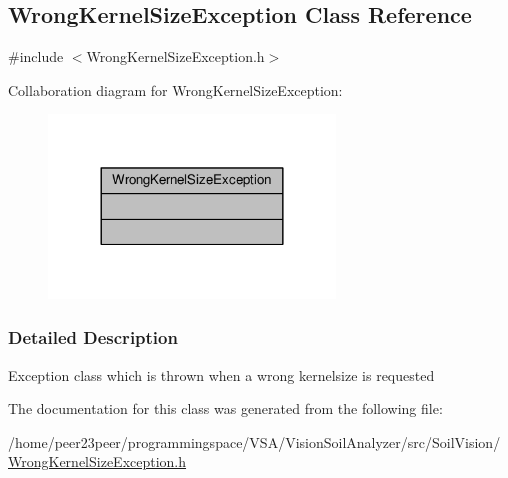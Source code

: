 \hypertarget{class_wrong_kernel_size_exception}{}\subsection{Wrong\+Kernel\+Size\+Exception Class Reference}
\label{class_wrong_kernel_size_exception}


{\ttfamily \#include $<$Wrong\+Kernel\+Size\+Exception.\+h$>$}



Collaboration diagram for Wrong\+Kernel\+Size\+Exception\+:
\nopagebreak
\begin{figure}[H]
\begin{center}
\leavevmode
\includegraphics[width=216pt]{class_wrong_kernel_size_exception__coll__graph}
\end{center}
\end{figure}


\subsubsection{Detailed Description}
Exception class which is thrown when a wrong kernelsize is requested 

The documentation for this class was generated from the following file\+:\begin{DoxyCompactItemize}
\item 
/home/peer23peer/programmingspace/\+V\+S\+A/\+Vision\+Soil\+Analyzer/src/\+Soil\+Vision/\hyperlink{_wrong_kernel_size_exception_8h}{Wrong\+Kernel\+Size\+Exception.\+h}\end{DoxyCompactItemize}
